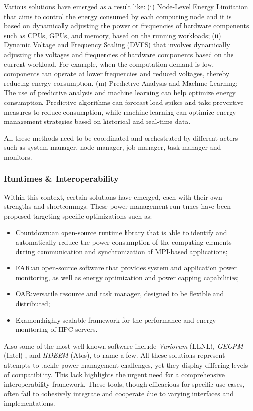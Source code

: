 Various solutions have emerged as a result like: (i) Node-Level Energy Limitation that aims to control the energy consumed by each computing node and it is based on dynamically adjusting the power or frequencies of hardware components such as CPUs, GPUs, and memory, based on the running workloads; (ii) Dynamic Voltage and Frequency Scaling (DVFS) that involves dynamically adjusting the voltages and frequencies of hardware components based on the current workload. For example, when the computation demand is low, components can operate at lower frequencies and reduced voltages, thereby reducing energy consumption. (iii) Predictive Analysis and Machine Learning: The use of predictive analysis and machine learning can help optimize energy consumption. Predictive algorithms can forecast load spikes and take preventive measures to reduce consumption, while machine learning can optimize energy management strategies based on historical and real-time data. 

\noindent All these methods need to be coordinated and orchestrated by different actors such as system manager, node manager, job manager, task manager and monitors.

\subsubsection {Runtimes \& Interoperability} \label{SSEC:runtimes}
Within this context, certain solutions have emerged, each with their own strengths and shortcomings. These power management run-times have been proposed targeting specific optimizations such as:
\begin{itemize}
    \item Countdown\cite{cesarini2019countdown}:\@ an open-source runtime library that is able to identify and automatically reduce the power consumption of the computing elements during communication and synchronization of MPI-based applications;
    \item EAR\cite{ear}:\@ an open-source software that provides system and application power monitoring, as well as energy optimization and power capping capabilities;
    \item OAR\cite{oar}:\@ versatile resource and task manager, designed to be flexible and distributed;
    \item Examon\cite{Examon}:\@ highly scalable framework for the performance and energy monitoring of HPC servers.
\end{itemize}

Also some of the most well-known software include \emph{Variorum} (LLNL), \emph{GEOPM} (Intel) \cite{GEOPM}, and \emph{HDEEM} (Atos)\cite{HDEEM}, to name a few.
All these solutions represent attempts to tackle power management challenges, yet they display differing levels of compatibility. This lack highlights the urgent need for a comprehensive interoperability framework. These tools, though efficacious for specific use cases, often fail to cohesively integrate and cooperate due to varying interfaces and implementations.

